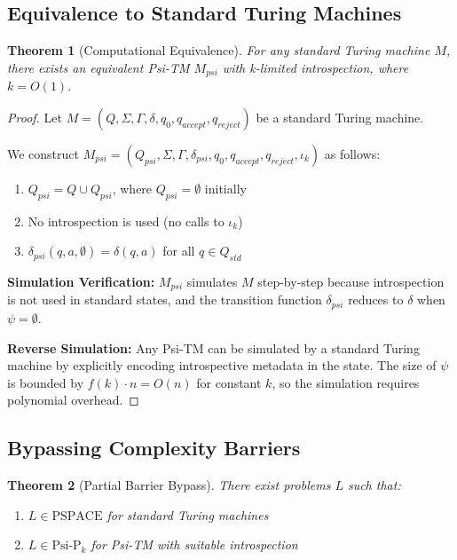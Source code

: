 \documentclass[11pt]{article}
\newtheorem{theorem}{Theorem}
\begin{document}
\subsection{Equivalence to Standard Turing Machines}

\begin{theorem}[Computational Equivalence]
For any standard Turing machine $M$, there exists an equivalent Psi-TM $M_{psi}$ with k-limited introspection, where $k = O(1)$.
\end{theorem}

\begin{proof}
Let $M = (Q, \Sigma, \Gamma, \delta, q_0, q_{accept}, q_{reject})$ be a standard Turing machine.

We construct $M_{psi} = (Q_{psi}, \Sigma, \Gamma, \delta_{psi}, q_0, q_{accept}, q_{reject}, \iota_k)$ as follows:

\begin{enumerate}
\item $Q_{psi} = Q \cup Q_{psi}$, where $Q_{psi} = \emptyset$ initially
\item No introspection is used (no calls to $\iota_k$)
\item $\delta_{psi}(q, a, \emptyset) = \delta(q, a)$ for all $q \in Q_{std}$
\end{enumerate}

\textbf{Simulation Verification:} 
$M_{psi}$ simulates $M$ step-by-step because introspection is not used in standard states, and the transition function $\delta_{psi}$ reduces to $\delta$ when $\psi = \emptyset$.

\textbf{Reverse Simulation:}
Any Psi-TM can be simulated by a standard Turing machine by explicitly encoding introspective metadata in the state. The size of $\psi$ is bounded by $f(k) \cdot n = O(n)$ for constant $k$, so the simulation requires polynomial overhead.
\end{proof}

\subsection{Bypassing Complexity Barriers}

\begin{theorem}[Partial Barrier Bypass]
There exist problems $L$ such that:
\begin{enumerate}
\item $L \in \text{PSPACE}$ for standard Turing machines
\item $L \in \text{Psi-P}_k$ for Psi-TM with suitable introspection
\end{enumerate}
\end{theorem}
\end{document}
